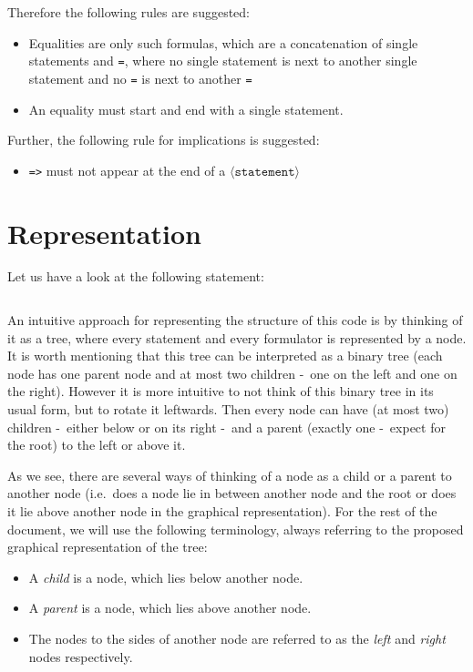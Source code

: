 \documentclass[british]{article}
\newenvironment{code}{\captionsetup{type=listing}}{}
\newcommand\prv{bc}
\newcommand\m[1]{\texttt{#1}}
\begin{document}
Therefore the following rules are suggested:
\begin{itemize}
	\item
		Equalities are only such formulas, which are a concatenation of single
		statements and \m{=}, where no single statement is next to another
		single statement and no \m{=} is next to another \m{=}%
	\item
		An equality must start and end with a single statement.%
\end{itemize}
\medskip{}

Further, the following rule for implications is suggested:

\begin{itemize}
\item \m{=>} must not appear at the end of a $\langle\texttt{statement}\rangle$
\end{itemize}
\pagebreak{}

\section{Representation}

Let us have a look at the following statement:

\begin{code}
\label{code:ex1}
\inputminted[linenos]{\prv}{examples/exmp1.prove}
\end{code}

An intuitive approach for representing the structure of this code is by thinking
of it as a tree, where every statement and every formulator is represented by a
node. It is worth mentioning that this tree can be interpreted as a binary tree
(each node has one parent node and at most two children -\ one on the left and
one on the right). However it is more intuitive to not think of this binary tree
in its usual form, but to rotate it leftwards. Then every node can have (at most
two) children -\ either below or on its right -\ and a parent (exactly one -\
expect for the root) to the left or above it.

As we see, there are several ways of thinking of a node as a child or a parent
to another node (i.e.\ does a node lie in between another node and the root or
does it lie above another node in the graphical representation). For the rest of
the document, we will use the following terminology, always referring to the
proposed graphical representation of the tree:

\begin{itemize}
	\item
		A \emph{child} is a node, which lies below another node.
	\item
		A \emph{parent} is a node, which lies above another node.
	\item
		The nodes to the sides of another node are referred to as the
		\emph{left} and \emph{right} nodes respectively.
\end{itemize}
\end{document}

